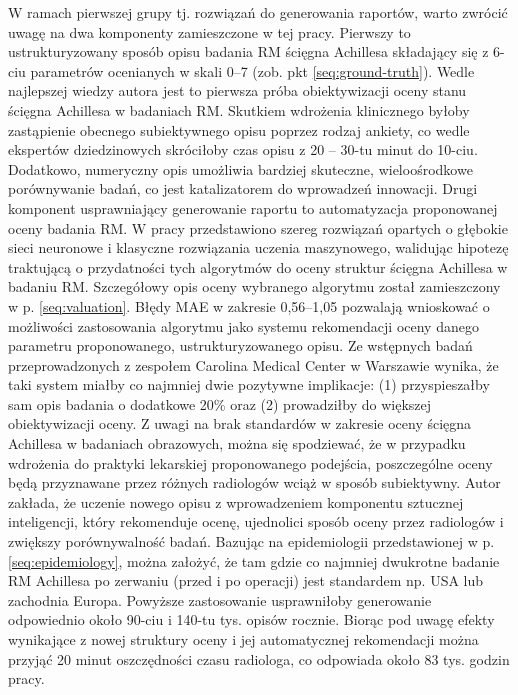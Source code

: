 W ramach pierwszej grupy tj. rozwiązań do generowania raportów, warto zwrócić uwagę na dwa komponenty zamieszczone w tej pracy. Pierwszy to ustrukturyzowany sposób opisu badania RM ścięgna Achillesa składający się z 6-ciu parametrów ocenianych w skali 0--7 (zob. pkt \ref{seq:ground-truth}). Wedle najlepszej wiedzy autora jest to pierwsza próba obiektywizacji oceny stanu ścięgna Achillesa w badaniach RM. Skutkiem wdrożenia klinicznego byłoby zastąpienie obecnego subiektywnego opisu poprzez rodzaj ankiety, co wedle ekspertów dziedzinowych skróciłoby czas opisu z 20 -- 30-tu minut do 10-ciu. Dodatkowo, numeryczny opis umożliwia bardziej skuteczne, wieloośrodkowe porównywanie badań, co jest katalizatorem do wprowadzeń innowacji. Drugi komponent usprawniający generowanie raportu to automatyzacja proponowanej oceny badania RM. W pracy przedstawiono szereg rozwiązań opartych \linebreak o głębokie sieci neuronowe i klasyczne rozwiązania uczenia maszynowego, walidując hipotezę traktującą o przydatności tych algorytmów do oceny struktur ścięgna Achillesa w badaniu RM. Szczegółowy opis oceny wybranego algorytmu został zamieszczony w p. \ref{seq:valuation}. Błędy MAE w zakresie 0,56--1,05 pozwalają wnioskować o możliwości zastosowania algorytmu jako systemu rekomendacji oceny danego parametru proponowanego, ustrukturyzowanego opisu. Ze wstępnych badań przeprowadzonych z zespołem Carolina Medical Center w Warszawie wynika, że taki system miałby \linebreak co najmniej dwie pozytywne implikacje: (1) przyspieszałby sam opis badania o dodatkowe 20\% oraz (2) prowadziłby do większej obiektywizacji oceny. Z uwagi na brak standardów w zakresie oceny ścięgna Achillesa w badaniach obrazowych, można się spodziewać, że w przypadku wdrożenia do praktyki lekarskiej proponowanego podejścia, poszczególne oceny będą przyznawane przez różnych radiologów wciąż w sposób subiektywny. Autor zakłada, że uczenie nowego opisu z wprowadzeniem komponentu sztucznej inteligencji, który rekomenduje ocenę, ujednolici sposób oceny przez radiologów i zwiększy porównywalność badań. Bazując na epidemiologii przedstawionej w p. \ref{seq:epidemiology}, można założyć, że tam gdzie co najmniej dwukrotne badanie RM Achillesa po zerwaniu (przed i po operacji) jest standardem np. USA lub zachodnia Europa. Powyższe zastosowanie usprawniłoby generowanie odpowiednio około 90-ciu i 140-tu tys. opisów rocznie. Biorąc pod uwagę efekty wynikające z nowej struktury oceny i jej automatycznej rekomendacji można przyjąć 20 minut oszczędności czasu radiologa, co odpowiada około 83 tys. godzin pracy.

